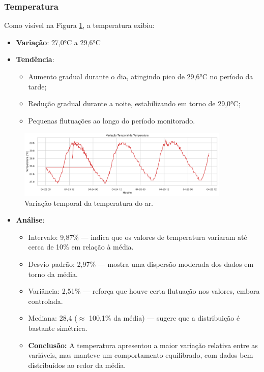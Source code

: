\documentclass[12pt, a4paper]{article}
\begin{document}
\subsubsection{Temperatura}
Como visível na Figura \ref{fig:temporal_temp}, a temperatura exibiu:
\begin{itemize}
    \item \textbf{Variação}: 27,0°C a 29,6°C
    \item \textbf{Tendência}:
    \begin{itemize}
        \item Aumento gradual durante o dia, atingindo pico de 29,6°C no período da tarde;
        \item Redução gradual durante a noite, estabilizando em torno de 29,0°C;
        \item Pequenas flutuações ao longo do período monitorado.
    \end{itemize}
\end{itemize}

\begin{figure}[H]
\centering
\includegraphics[width=0.9\textwidth]{graficos/temporal_temp.png}
\caption{Variação temporal da temperatura do ar.}
\label{fig:temporal_temp}
\end{figure}

\begin{itemize}
    \item \textbf{Análise}:
        \begin{itemize}
    \item Intervalo: 9{,}87\% — indica que os valores de temperatura variaram até cerca de 10\% em relação à média.
    \item Desvio padrão: 2{,}97\% — mostra uma dispersão moderada dos dados em torno da média.
    \item Variância: 2{,}51\% — reforça que houve certa flutuação nos valores, embora controlada.
    \item Mediana: 28{,}4 ($\approx$ 100{,}1\% da média) — sugere que a distribuição é bastante simétrica.
    \item \textbf{Conclusão:} A temperatura apresentou a maior variação relativa entre as variáveis, mas manteve um comportamento equilibrado, com dados bem distribuídos ao redor da média.
\end{itemize}
\end{itemize}
\end{document}
